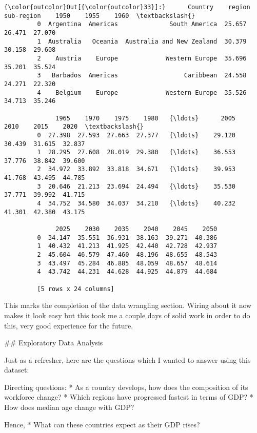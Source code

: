 \documentclass[11pt]{article}
\begin{document}
\begin{Verbatim}[commandchars=\\\{\}]
{\color{outcolor}Out[{\color{outcolor}33}]:}      Country    region                 sub-region    1950    1955    1960  \textbackslash{}
         0  Argentina  Americas              South America  25.657  26.471  27.070   
         1  Australia   Oceania  Australia and New Zealand  30.379  30.158  29.608   
         2    Austria    Europe             Western Europe  35.696  35.201  35.524   
         3   Barbados  Americas                  Caribbean  24.558  24.271  22.320   
         4    Belgium    Europe             Western Europe  35.526  34.713  35.246   
         
              1965    1970    1975    1980   {\ldots}      2005    2010    2015    2020  \textbackslash{}
         0  27.398  27.593  27.663  27.377   {\ldots}    29.120  30.439  31.615  32.837   
         1  28.295  27.608  28.019  29.380   {\ldots}    36.553  37.776  38.842  39.600   
         2  34.972  33.892  33.818  34.671   {\ldots}    39.953  41.768  43.495  44.785   
         3  20.646  21.213  23.694  24.494   {\ldots}    35.530  37.771  39.992  41.715   
         4  34.752  34.580  34.037  34.210   {\ldots}    40.232  41.301  42.380  43.175   
         
              2025    2030    2035    2040    2045    2050  
         0  34.147  35.551  36.931  38.163  39.271  40.386  
         1  40.432  41.213  41.925  42.440  42.728  42.937  
         2  45.604  46.579  47.460  48.196  48.655  48.543  
         3  43.497  45.284  46.885  48.059  48.657  48.614  
         4  43.742  44.231  44.628  44.925  44.879  44.684  
         
         [5 rows x 24 columns]
\end{Verbatim}
            
    This marks the completion of the data wrangling section. Wiring about it
now makes it look easy but this took me a couple days of solid work in
order to do this, very good experience for the future.

     \#\# Exploratory Data Analysis

    Just as a refresher, here are the questions which I wanted to answer
using this dataset:

Directing questions: * As a country develops, how does the composition
of its workforce change? * Which regions have progressed fastest in
terms of GDP? * How does median age change with GDP?

Hence, * What can these countries expect as their GDP rises?
\end{document}
